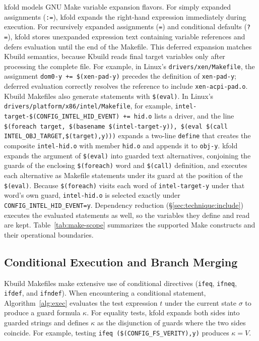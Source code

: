 \documentclass[acmsmall]{acmart}
\newcommand{\tool}{\textsf{kfold}\xspace}
\begin{document}
\tool models GNU Make variable expansion flavors.
For simply expanded assignments (\texttt{:=}), \tool expands the right-hand expression immediately during execution.
For recursively expanded assignments (\texttt{=}) and conditional defaults (\texttt{?=}), \tool stores unexpanded expression text containing variable references and defers evaluation until the end of the Makefile.
This deferred expansion matches Kbuild semantics, because Kbuild reads final target variables only after processing the complete file.
For example, in Linux's \texttt{drivers/xen/Makefile}, the assignment \texttt{dom0-y += \$(xen-pad-y)} precedes the definition of \texttt{xen-pad-y}; deferred evaluation correctly resolves the reference to include \texttt{xen-acpi-pad.o}.
Kbuild Makefiles also generate statements with \texttt{\$(eval)}.
In Linux's \texttt{drivers/platform/x86/intel/Makefile}, for example, \texttt{intel-target-\$(CONFIG\_INTEL\_HID\_EVENT) += hid.o} lists a driver, and the line \texttt{\$(foreach target, \$(basename \$(intel-target-y)), \$(eval \$(call INTEL\_OBJ\_TARGET,\$(target),y)))} expands a two-line \texttt{define} that creates the composite \texttt{intel-hid.o} with member \texttt{hid.o} and appends it to \texttt{obj-y}.
\tool expands the argument of \texttt{\$(eval)} into guarded text alternatives, conjoining the guards of the enclosing \texttt{\$(foreach)} word and \texttt{\$(call)} definition, and executes each alternative as Makefile statements under its guard at the position of the \texttt{\$(eval)}.
Because \texttt{\$(foreach)} visits each word of \texttt{intel-target-y} under that word's own guard, \texttt{intel-hid.o} is selected exactly under \texttt{CONFIG\_INTEL\_HID\_EVENT=y}.
Dependency reduction (\S\ref{sec:technique:include}) executes the evaluated statements as well, so the variables they define and read are kept.
Table~\ref{tab:make-scope} summarizes the supported Make constructs and their operational boundaries.

\subsection{Conditional Execution and Branch Merging}\label{sec:technique:merge}

Kbuild Makefiles make extensive use of conditional directives (\texttt{ifeq}, \texttt{ifneq}, \texttt{ifdef}, and \texttt{ifndef}).
When encountering a conditional statement, Algorithm~\ref{alg:exec} evaluates the test expression $t$ under the current state $\sigma$ to produce a guard formula $\kappa$.
For equality tests, \tool expands both sides into guarded strings and defines $\kappa$ as the disjunction of guards where the two sides coincide.
For example, testing \texttt{ifeq (\$(CONFIG\_FS\_VERITY),y)} produces $\kappa = V$.
\end{document}
